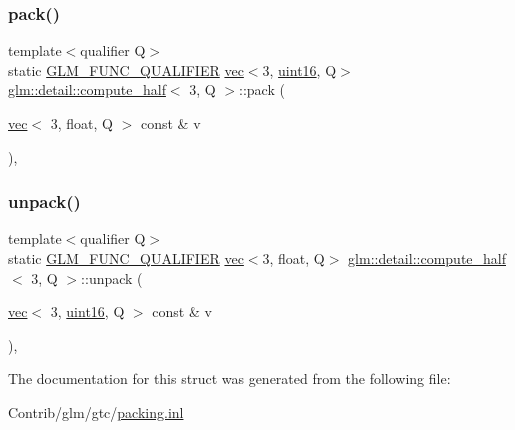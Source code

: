 \subsubsection{\texorpdfstring{pack()}{pack()}}
{\footnotesize\ttfamily template$<$qualifier Q$>$ \\
static \mbox{\hyperlink{setup_8hpp_a33fdea6f91c5f834105f7415e2a64407}{G\+L\+M\+\_\+\+F\+U\+N\+C\+\_\+\+Q\+U\+A\+L\+I\+F\+I\+ER}} \mbox{\hyperlink{structglm_1_1vec}{vec}}$<$3, \mbox{\hyperlink{namespaceglm_1_1detail_a47b2a7d006d187338e8031a352d1ce56}{uint16}}, Q$>$ \mbox{\hyperlink{structglm_1_1detail_1_1compute__half}{glm\+::detail\+::compute\+\_\+half}}$<$ 3, Q $>$\+::pack (\begin{DoxyParamCaption}\item[{\mbox{\hyperlink{structglm_1_1vec}{vec}}$<$ 3, float, Q $>$ const \&}]{v }\end{DoxyParamCaption})\hspace{0.3cm}{\ttfamily [inline]}, {\ttfamily [static]}}

\mbox{\label{structglm_1_1detail_1_1compute__half_3_013_00_01_q_01_4_a888b7245229f861127dedbacf10e1568}} 
\subsubsection{\texorpdfstring{unpack()}{unpack()}}
{\footnotesize\ttfamily template$<$qualifier Q$>$ \\
static \mbox{\hyperlink{setup_8hpp_a33fdea6f91c5f834105f7415e2a64407}{G\+L\+M\+\_\+\+F\+U\+N\+C\+\_\+\+Q\+U\+A\+L\+I\+F\+I\+ER}} \mbox{\hyperlink{structglm_1_1vec}{vec}}$<$3, float, Q$>$ \mbox{\hyperlink{structglm_1_1detail_1_1compute__half}{glm\+::detail\+::compute\+\_\+half}}$<$ 3, Q $>$\+::unpack (\begin{DoxyParamCaption}\item[{\mbox{\hyperlink{structglm_1_1vec}{vec}}$<$ 3, \mbox{\hyperlink{namespaceglm_1_1detail_a47b2a7d006d187338e8031a352d1ce56}{uint16}}, Q $>$ const \&}]{v }\end{DoxyParamCaption})\hspace{0.3cm}{\ttfamily [inline]}, {\ttfamily [static]}}



The documentation for this struct was generated from the following file\+:\begin{DoxyCompactItemize}
\item 
Contrib/glm/gtc/\mbox{\hyperlink{packing_8inl}{packing.\+inl}}\end{DoxyCompactItemize}
